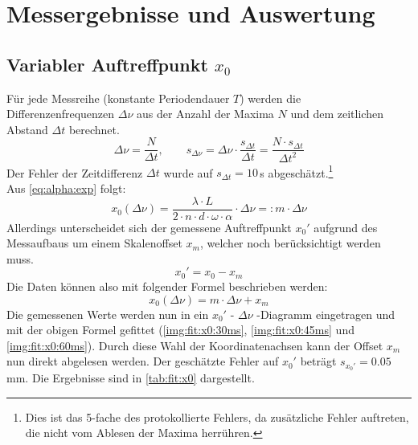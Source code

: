 \section{Messergebnisse und Auswertung}
\subsection{Variabler Auftreffpunkt \texorpdfstring{$x_0$}{x0}}
Für jede Messreihe (konstante Periodendauer $T$) werden die Differenzenfrequenzen $\Delta \nu$ aus der Anzahl der Maxima $N$ und dem zeitlichen 
Abstand $\Delta t$ berechnet.
\begin{equation}
  \label{eq:delta_nu}
  \Delta \nu = \frac{N}{\Delta t}, \qquad s_{\Delta \nu} = \Delta \nu \cdot \frac{s_{\Delta t}}{\Delta t} = \frac{N \cdot s_{\Delta t}}{\Delta t^2}
\end{equation}
Der Fehler der Zeitdifferenz $\Delta t$ wurde auf $s_{\Delta t} = 10$\,\textmu s abgeschätzt.\footnote{Dies ist das 5-fache des protokollierte Fehlers, da 
zusätzliche Fehler auftreten, die nicht vom Ablesen der Maxima herrühren.} \\
Aus \autoref{eq:alpha:exp} folgt:
\begin{equation}
  \label{eq:x0:m}
  x_0(\Delta \nu) = \frac{\lambda \cdot L}{2 \cdot n \cdot d \cdot \omega \cdot \alpha} \cdot \Delta \nu =: m \cdot \Delta \nu
\end{equation}
Allerdings unterscheidet sich der gemessene Auftreffpunkt $x_0'$ aufgrund des Messaufbaus um einem Skalenoffset $x_m$, 
welcher noch berücksichtigt werden muss.
\begin{equation}
  x_0' = x_0 - x_m
\end{equation}
Die Daten können also mit folgender Formel beschrieben werden:
\begin{equation}
  x_0(\Delta \nu) = m \cdot \Delta \nu + x_m
\end{equation}
Die gemessenen Werte werden nun in ein $x_0'$ - $\Delta \nu$ -Diagramm eingetragen und mit der obigen Formel gefittet 
(\autoref{img:fit:x0:30ms}, \autoref{img:fit:x0:45ms} und \autoref{img:fit:x0:60ms}). Durch diese Wahl der Koordinatenachsen kann der Offset $x_m$ 
nun direkt abgelesen werden.
Der geschätzte Fehler auf $x_0'$ beträgt $s_{x_0'} = 0.05$\,mm. Die Ergebnisse sind in \autoref{tab:fit:x0} dargestellt.

